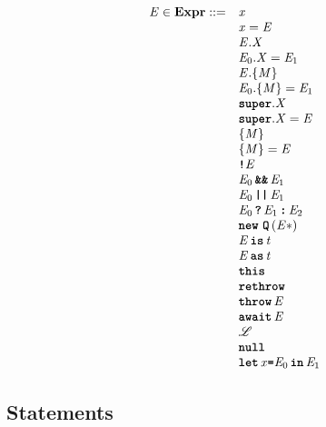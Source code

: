 \documentclass[a4paper,oneside,fleqn]{article}
\newcommand{\synt}[1]{\ensuremath{\text{\textbf{\texttt{#1}}}}}
\newcommand{\this}{\synt{this}}
\newcommand{\Rethrow}{\synt{rethrow}}
\newcommand{\Throw}[1]{\synt{throw}\,#1}
\newcommand{\dexpr}{\mathbf{Expr}}
\newcommand{\idmeta}{\ensuremath{\mathit{X}}}
\newcommand{\typemeta}{\ensuremath{\mathit{t}}}
\begin{document}
\[
\begin{array}{rl}
  \expressionmeta \in \dexpr ::=
  & \VariableGet{\variablemeta} \\
  & \VariableSet{\variablemeta}{\expressionmeta} \\
  & \PropertyGet{\expressionmeta}{\idmeta} \\
  & \PropertySet{\expressionmeta_0}{\idmeta}{\expressionmeta_1} \\
  & \DirectPropertyGet{\expressionmeta}{\membermeta} \\
  & \DirectPropertySet{\expressionmeta_0}{\membermeta}{\expressionmeta_1} \\
  & \SuperPropertyGet{\idmeta} \\
  & \SuperPropertySet{\idmeta}{\expressionmeta} \\
  & \StaticGet{\membermeta} \\
  & \StaticSet{\membermeta}{\expressionmeta} \\
  & \Not{\expressionmeta} \\
  & \AndExpression{\expressionmeta_0}{\expressionmeta_1} \\
  & \OrExpression{\expressionmeta_0}{\expressionmeta_1} \\
  & \ConditionalExpression{\expressionmeta_0}{\expressionmeta_1}{\expressionmeta_2} \\
  & \New{\synt{Q}}{\expressionmeta*} \\
  & \IsExpression{\expressionmeta}{\typemeta} \\
  & \AsExpression{\expressionmeta}{\typemeta} \\
  & \this \\
  & \Rethrow \\
  & \Throw{\expressionmeta} \\
  & \AwaitExpression{\expressionmeta} \\
  & \lit \\
  & \NullLiteral \\
  & \Let{\variablemeta}{\expressionmeta_0}{\expressionmeta_1} \\
\end{array}
\]


\subsection{Statements}
\label{subsec:stmt-syntax}

\newcommand{\ExpressionStatement}[1]{\{\, #1\, \}}
\newcommand{\Block}[1]{\{\, #1\, \}}
\newcommand{\EmptyStatement}{\{\}}
\end{document}
